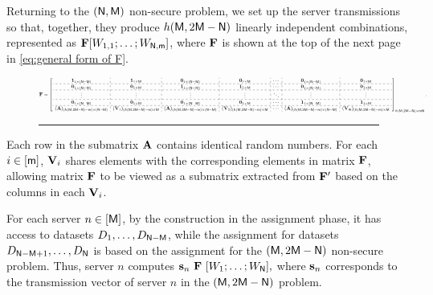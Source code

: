 \documentclass[conference,letterpaper]{IEEEtran}
\begin{document}
Returning to the \( ({\sf N}, {\sf M}) \) non-secure problem, we set up the server transmissions so that, together, they produce \( h({\sf M}, 2{\sf M} - {\sf N}) \) linearly independent combinations, represented as \( {\bf F} [W_{1,1}; \ldots; W_{{\sf N}, {\sf m}}] \), where \( {\bf F} \) is shown at the top of the next page in \eqref{eq:general form of F}.
\begin{figure}[ht]
\begin{equation}
\resizebox{\textwidth}{!}{$ %
{\bf F} = 
\left[
\begin{array}{c:c:c:c:c:c:c}
{\bf 1}_{1 \times (\Nsf - \Msf)} & {\bf 1}_{1 \times \Msf} & {\bf 0}_{1 \times (\Nsf - \Msf)} & {\bf 0}_{1 \times \Msf} & \cdots & {\bf 0}_{1 \times (\Nsf - \Msf)} & {\bf 0}_{1 \times \Msf} \\ \hdashline
{\bf 0}_{1 \times (\Nsf - \Msf)} & {\bf 0}_{1 \times \Msf} & {\bf 1}_{1 \times (\Nsf - \Msf)} & {\bf 1}_{1 \times \Msf} & \cdots & {\bf 0}_{1 \times (\Nsf - \Msf)} & {\bf 0}_{1 \times \Msf} \\ \hdashline 
\vdots & \vdots & \vdots & \vdots & \ddots & \vdots & \vdots \\ \hdashline
{\bf 0}_{1 \times (\Nsf - \Msf)} & {\bf 0}_{1 \times \Msf} & {\bf 0}_{1 \times (\Nsf - \Msf)} & {\bf 0}_{1 \times \Msf} & \cdots & {\bf 1}_{1 \times (\Nsf - \Msf)} & {\bf 1}_{1 \times \Msf} \\ \hdashline
({\bf A})_{(h(\Msf, 2\Msf-\Nsf) - \msf) \times (\Nsf - \Msf)} & ({\bf V}_{1})_{(h(\Msf, 2\Msf-\Nsf) - \msf) \times \Msf} & ({\bf A})_{(h(\Msf, 2\Msf-\Nsf) - \msf) \times (\Nsf - \Msf)} & ({\bf V}_{2})_{(h(\Msf, 2\Msf-\Nsf) - \msf) \times \Msf} & \cdots & ({\bf A})_{(h(\Msf, 2\Msf-\Nsf) - \msf) \times (\Nsf - \Msf)} & ({\bf V}_{\msf})_{(h(\Msf, 2\Msf-\Nsf) - \msf) \times \Msf}
\end{array}
\right]_{h(\Msf, 2\Msf - \Nsf) \times \msf \Nsf}.$}
\label{eq:general form of F}
\end{equation}
\rule{\textwidth}{0.2pt} %
\end{figure}
Each row in the submatrix ${\bf A}$ contains identical random numbers. For each $i \in [{\sf m}]$, ${\bf V}_i$ shares elements with the corresponding elements in matrix ${\bf F}$, allowing matrix ${\bf F}$ to be viewed as a submatrix extracted from ${\bf F}'$ based on the columns in each ${\bf V}_i$.

For each server $n \in [{\sf M}]$, by the construction in the assignment phase, it has access to datasets $D_1, \ldots, D_{{\sf N} - {\sf M}}$, while the assignment for datasets $D_{{\sf N} - {\sf M} + 1}, \ldots, D_{{\sf N}}$ is based on the assignment for the $({\sf M}, 2{\sf M} - {\sf N})$ non-secure problem. Thus, server $n$ computes
$ 
{\bf s}_{n} \ {\bf F} \ [W_1; \ldots; W_{{\sf N}}],
$
where ${\bf s}_n$ corresponds to the transmission vector of server $n$ in the $({\sf M}, 2{\sf M} - {\sf N})$ problem.
\end{document}
